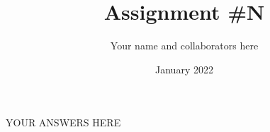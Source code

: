 \documentclass{article}
\title{Assignment \#N}
\author{Your name and collaborators here}
\date{January 2022}
\begin{document}
\maketitle
YOUR ANSWERS HERE
\newline\newline\newline\newline

\end{document}
